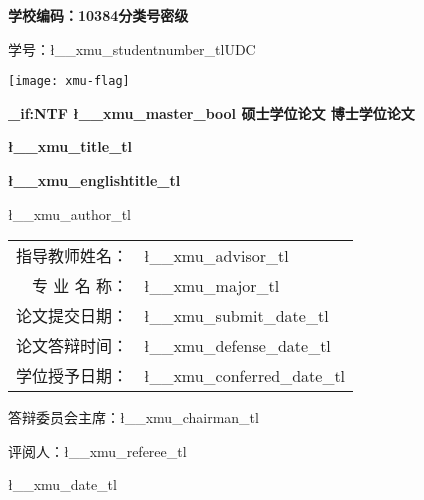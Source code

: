 \ExplSyntaxOn
\begin{center}
	{
		\vspace*{-5ex}
		\rmfamily\bfseries{}
		学校编码：10384\hfill 分类号\quad 密级 \par 
		学号：\l__xmu_studentnumber_tl\hfill UDC\;\par\vspace{6ex}
		\centering\texttt{[image: xmu-flag]}\par\vspace{4ex}
	}
	{
		\rmfamily\bfseries{}
		\bool_if:NTF \l__xmu_master_bool{
			硕\quad 士\quad 学\quad 位\quad 论\quad 文
			}{
			博\quad 士\quad 学\quad 位\quad 论\quad 文
		}
		\par\vspace{3ex}
	}
	{
		\sffamily\bfseries{}\l__xmu_title_tl\par\vspace{2ex}
	}
	{
		\rmfamily\bfseries{}\l__xmu_englishtitle_tl\par\vspace{2ex}
	}
	{
		\ttfamily{}\l__xmu_author_tl\par\vspace{2ex}
	}
	{
		\ttfamily{}
		\begin{tabular}{rl} 
			指导教师姓名：& \l__xmu_advisor_tl \\
			专\hspace{0.66\ccwd} 业\hspace{0.66\ccwd} 名\hspace{0.66\ccwd} 称：& \l__xmu_major_tl \\
			论文提交日期：& \l__xmu_submit_date_tl\\
			论文答辩时间：& \l__xmu_defense_date_tl\\
			学位授予日期：& \l__xmu_conferred_date_tl\\   
		\end{tabular}%
		\par\vspace{1cm}
	}
	{
		答辩委员会主席：\l__xmu_chairman_tl\par
		评阅人：\l__xmu_referee_tl\par 
		\l__xmu_date_tl\par 
	}
\end{center}

\ExplSyntaxOff